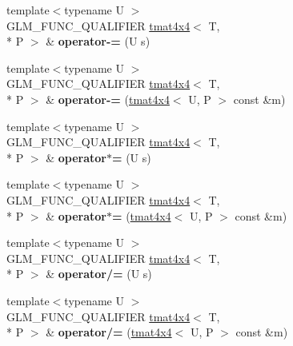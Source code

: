 \begin{DoxyCompactItemize}
\item 
\hypertarget{structglm_1_1tmat4x4_a70738b22e55ed76f5283241440f5e5ab}{{\footnotesize template$<$typename U $>$ }\\G\-L\-M\-\_\-\-F\-U\-N\-C\-\_\-\-Q\-U\-A\-L\-I\-F\-I\-E\-R \hyperlink{structglm_1_1tmat4x4}{tmat4x4}$<$ T, \\*
P $>$ \& {\bfseries operator-\/=} (U s)}\label{structglm_1_1tmat4x4_a70738b22e55ed76f5283241440f5e5ab}

\item 
\hypertarget{structglm_1_1tmat4x4_a3162224a5aa306caa17ce2de9b2050cc}{{\footnotesize template$<$typename U $>$ }\\G\-L\-M\-\_\-\-F\-U\-N\-C\-\_\-\-Q\-U\-A\-L\-I\-F\-I\-E\-R \hyperlink{structglm_1_1tmat4x4}{tmat4x4}$<$ T, \\*
P $>$ \& {\bfseries operator-\/=} (\hyperlink{structglm_1_1tmat4x4}{tmat4x4}$<$ U, P $>$ const \&m)}\label{structglm_1_1tmat4x4_a3162224a5aa306caa17ce2de9b2050cc}

\item 
\hypertarget{structglm_1_1tmat4x4_a2356a940d6d70f2571516f8111d22b02}{{\footnotesize template$<$typename U $>$ }\\G\-L\-M\-\_\-\-F\-U\-N\-C\-\_\-\-Q\-U\-A\-L\-I\-F\-I\-E\-R \hyperlink{structglm_1_1tmat4x4}{tmat4x4}$<$ T, \\*
P $>$ \& {\bfseries operator$\ast$=} (U s)}\label{structglm_1_1tmat4x4_a2356a940d6d70f2571516f8111d22b02}

\item 
\hypertarget{structglm_1_1tmat4x4_a0054571806bb1caf0fdbc127fe406dc2}{{\footnotesize template$<$typename U $>$ }\\G\-L\-M\-\_\-\-F\-U\-N\-C\-\_\-\-Q\-U\-A\-L\-I\-F\-I\-E\-R \hyperlink{structglm_1_1tmat4x4}{tmat4x4}$<$ T, \\*
P $>$ \& {\bfseries operator$\ast$=} (\hyperlink{structglm_1_1tmat4x4}{tmat4x4}$<$ U, P $>$ const \&m)}\label{structglm_1_1tmat4x4_a0054571806bb1caf0fdbc127fe406dc2}

\item 
\hypertarget{structglm_1_1tmat4x4_ad7713e2bf039546e1799fe53f28d91ff}{{\footnotesize template$<$typename U $>$ }\\G\-L\-M\-\_\-\-F\-U\-N\-C\-\_\-\-Q\-U\-A\-L\-I\-F\-I\-E\-R \hyperlink{structglm_1_1tmat4x4}{tmat4x4}$<$ T, \\*
P $>$ \& {\bfseries operator/=} (U s)}\label{structglm_1_1tmat4x4_ad7713e2bf039546e1799fe53f28d91ff}

\item 
\hypertarget{structglm_1_1tmat4x4_abd9e65e0368e0cd8e977586f6a8706d4}{{\footnotesize template$<$typename U $>$ }\\G\-L\-M\-\_\-\-F\-U\-N\-C\-\_\-\-Q\-U\-A\-L\-I\-F\-I\-E\-R \hyperlink{structglm_1_1tmat4x4}{tmat4x4}$<$ T, \\*
P $>$ \& {\bfseries operator/=} (\hyperlink{structglm_1_1tmat4x4}{tmat4x4}$<$ U, P $>$ const \&m)}\label{structglm_1_1tmat4x4_abd9e65e0368e0cd8e977586f6a8706d4}

\end{DoxyCompactItemize}
